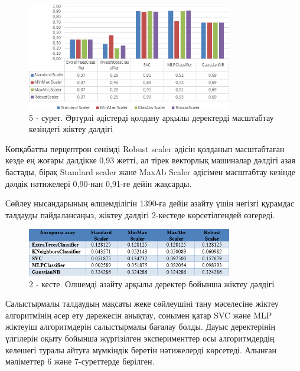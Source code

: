 \begin{figure}[H]
	\centering
	\includegraphics[width=0.8\textwidth]{media/ict/image9}
	\caption*{5 - сурет. Әртүрлі әдістерді қолдану арқылы деректерді масштабтау кезіндегі жіктеу дәлдігі}
\end{figure}

\begin{multicols}{2}
Көпқабатты перцептрон сенімді Robust scaler әдісін қолданып масштабтаған
кезде ең жоғары дәлдікке 0,93 жетті, ал тірек векторлық машиналар
дәлдігі азая бастады, бірақ Standard scaler және MaxAb Scaler әдісімен
масштабтау кезінде дәлдік нәтижелері 0,90-нан 0,91-ге дейін жақсарды.

Сөйлеу нысандарының өлшемділігін 1390-ға дейін азайту үшін негізгі
құрамдас талдауды пайдалансаңыз, жіктеу дәлдігі 2-кестеде көрсетілгендей
өзгереді.
\end{multicols}

\begin{figure}[H]
	\centering
	\includegraphics[width=0.8\textwidth]{media/ict/image10}
	\caption*{2 - кесте. Өлшемді азайту арқылы деректер бойынша жіктеу дәлдігі}
\end{figure}

\begin{multicols}{2}
Салыстырмалы талдаудың мақсаты жеке сөйлеушіні тану мәселесіне жіктеу
алгоритмінің әсер ету дәрежесін анықтау, сонымен қатар SVC және MLP
жіктеуіш алгоритмдерін салыстырмалы бағалау болды. Дауыс деректерінің
үлгілерін оқыту бойынша жүргізілген эксперименттер осы алгоритмдердің
келешегі туралы айтуға мүмкіндік беретін нәтижелерді көрсетеді. Алынған
мәліметтер 6 және 7-суреттерде берілген.
\end{multicols}

